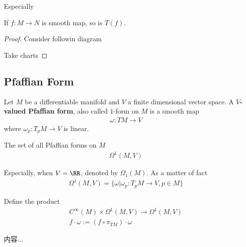 \documentclass[Total.tex]{subfiles}
\begin{document}
			Especially
			
			\begin{proposition}
				If $f:M\rightarrow N$ is smooth map, so is $T(f)$. 
			\end{proposition}
			\begin{proof}
				Consider followin diagram
				\begin{center}
				\end{center}
				
				Take charts 
			\end{proof}
			
			\subsection{Pfaffian Form}
			
			\begin{Def}
				Let $M$ be a differentiable manifold and $V$ a finite dimensional vector space. A \textbf{$V$-valued Pfaffian form}, also called $1$-form on $M$ is a smooth map
				\begin{gather*}
					\omega:TM\rightarrow V
				\end{gather*}
				where $\omega_p:T_p M\rightarrow V$ is linear. 
			\end{Def}
			
			The set of all Pfaffian forms on $M$
			\begin{gather*}
				\Omega^1(M,V)
			\end{gather*}
			
			Especially, when $V=\RR$, denoted by $\Omega_1(M)$. As a matter of fact
			\begin{gather*}
				\Omega^1(M,V)=\{\omega|\omega_p:T_p M\rightarrow V,p\in M\}
			\end{gather*}
			
			\begin{Def}
				Define the product
				\begin{gather*}
					C^\infty(M)\times \Omega^1(M,V)\rightarrow \Omega^1(M,V)\\
					f\cdot \omega:=(f\circ \pi_{TM})\cdot \omega
				\end{gather*}
			\end{Def}
			
			\begin{example}
				内容...
			\end{example}
			
\end{document}
